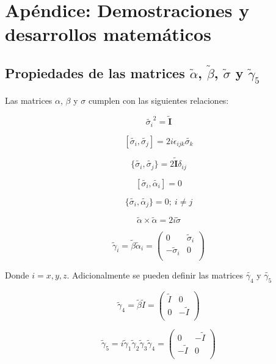 \documentclass[a4paper, 12pt]{article} %
\begin{document}

\section{Ap\'endice: Demostraciones y desarrollos matem\'aticos}\label{sec:apendice}

\subsection{Propiedades de las matrices $\widetilde{\alpha}$, $\widetilde{\beta}$,  
$\widetilde{\sigma}$ y $\widetilde{\gamma}_5$}\label{sec:gamma5}

Las matrices $\alpha$, $\beta$ y $\sigma$ cumplen con las siguientes relaciones:

\[
\widetilde{\sigma_i}^2 = \widetilde{\mathbf{I}}
\]

\[
[\widetilde{\sigma_i}, \widetilde{\sigma_j}] = 2i\epsilon_{ijk}\widetilde{\sigma_k}
\]

\[
\{\widetilde{\sigma_i},\widetilde{\sigma_j}\} = 2\widetilde{\mathbf{I}}\delta_{ij}
\]

\[
[\widetilde{\sigma_i}, \widetilde{\alpha_i}] = 0
\]

\[
\{ \widetilde{\sigma_i}, \widetilde{\alpha_j} \} = 0;  \ i \neq j
\]

\[
\widetilde{\alpha} \times \widetilde{\alpha} = 2i\widetilde{\sigma}
\]

\[
\widetilde{\gamma}_i = \widetilde{\beta}\widetilde{\alpha}_i = 
\begin{pmatrix}
0 & \widetilde{\sigma}_i \\
-\widetilde{\sigma}_i & 0 \\
\end{pmatrix}
\]

Donde $i = x, y, z$. Adicionalmente se pueden definir las matrices $\widetilde{\gamma_4}$ y $\widetilde{\gamma_5}$


\[
\widetilde{\gamma}_4 = \widetilde{\beta}\widetilde{I} = 
\begin{pmatrix}
\widetilde{I} & 0 \\
0 & -\widetilde{I}  \\
\end{pmatrix}
\]

\begin{equation}\label{eq:gamma5}
\widetilde{\gamma}_5 = i\widetilde{\gamma}_1 \widetilde{\gamma}_2 \widetilde{\gamma}_3 \widetilde{\gamma}_4 = 
\begin{pmatrix}
0 & -\widetilde{I} \\
-\widetilde{I} & 0 \\
\end{pmatrix}
\end{equation}
\end{document}
